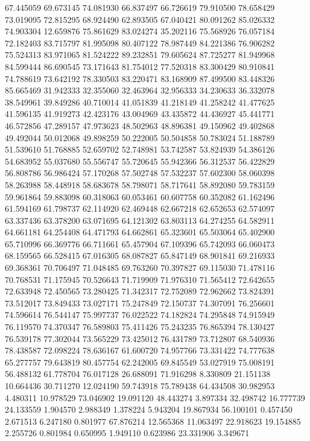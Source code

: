67.445059
69.673145
74.081930
66.837497
66.726619
79.910500
78.658429
73.019095
72.815295
68.924490
62.893505
67.040421
80.091262
85.026332
74.903304
12.659876
75.861629
83.024274
35.202116
75.568926
76.057184
72.182403
83.715797
81.995098
80.407122
78.987449
84.221386
76.906282
75.524313
83.971065
81.524222
89.232851
79.605624
87.725277
81.949968
84.599444
86.690545
73.171643
81.754012
77.520318
83.300429
80.910841
74.788619
73.642192
78.330503
83.220471
83.168909
87.499500
83.448326
85.665469
31.942333
32.355060
32.463964
32.956333
34.230633
36.332078
38.549961
39.849286
40.710014
41.051839
41.218149
41.258242
41.477625
41.596135
41.919273
42.423176
43.004969
43.435872
44.436927
45.441771
46.572856
47.289157
47.973623
48.502963
48.896381
49.150962
49.402868
49.492044
50.012068
49.898259
50.222005
50.504858
50.783024
51.188789
51.539610
51.768885
52.659702
52.748981
53.742587
53.824939
54.386126
54.683952
55.037680
55.556747
55.720645
55.942366
56.312537
56.422829
56.808786
56.986424
57.170268
57.502748
57.532237
57.602300
58.060398
58.263988
58.448918
58.683678
58.798071
58.717641
58.892080
59.783159
59.961864
59.883098
60.318063
60.053461
60.607758
60.352082
61.162496
61.594169
61.798737
62.114920
62.469448
62.667218
62.652653
62.574097
63.337436
63.378200
63.071695
64.121302
63.803113
64.274255
64.582911
64.661181
64.254408
64.471793
64.662861
65.323601
65.503064
65.402900
65.710996
66.369776
66.711661
65.457904
67.109396
65.742093
66.060473
68.159565
66.528415
67.016305
68.087827
65.847149
68.901841
69.216933
69.368361
70.706497
71.048485
69.763260
70.397827
69.115030
71.478116
70.768531
71.175945
70.526643
71.719909
71.976310
71.565412
72.642655
72.633948
72.450565
73.280425
71.342317
72.752089
72.962662
73.824391
73.512017
73.849433
73.027171
75.247849
72.150737
74.307091
76.256601
74.596614
76.544147
75.997737
76.022522
74.182824
74.295848
74.915949
76.119570
74.370347
76.589803
75.411426
75.243235
76.865394
78.130427
76.539178
77.302044
73.565229
73.425012
76.431789
73.712807
68.540936
78.438587
72.098224
78.636167
61.600720
74.957766
73.331422
74.777638
65.277757
79.643819
80.457754
62.242005
69.845549
53.027919
75.008191
56.488132
61.778704
76.017128
26.688091
71.916298
8.330809
21.151138
10.664436
30.711270
12.024190
59.743918
75.789438
64.434508
30.982953
4.480311
10.978529
73.046902
19.091120
48.443274
3.897334
32.498742
16.777739
24.133559
1.904570
2.988349
1.378224
5.943204
19.867934
56.100101
0.457450
2.671513
6.247180
0.801977
67.876214
12.565368
11.063497
22.918623
19.154885
2.255726
0.801984
0.650995
1.949110
0.623986
23.331906
3.349671
